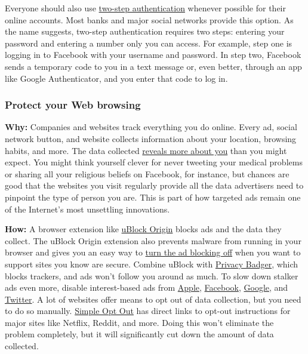 Everyone should also use
\href{https://www.nytimes3xbfgragh.onion/2019/03/27/technology/personaltech/two-step-authentication.html}{two-step
authentication} whenever possible for their online accounts. Most banks
and major social networks provide this option. As the name suggests,
two-step authentication requires two steps: entering your password and
entering a number only you can access. For example, step one is logging
in to Facebook with your username and password. In step two, Facebook
sends a temporary code to you in a text message or, even better, through
an app like Google Authenticator, and you enter that code to log in.~

\hypertarget{protect-your-web-browsing}{%
\subsubsection{Protect your Web
browsing}\label{protect-your-web-browsing}}

\textbf{Why:} Companies and websites track everything you do online.
Every ad, social network button, and website collects information about
your location, browsing habits, and more. The data collected
\href{https://www.nytimes3xbfgragh.onion/2018/08/15/technology/personaltech/stop-targeted-stalker-ads.html}{reveals
more about you} than you might expect. You might think yourself clever
for never tweeting your medical problems or sharing all your religious
beliefs on Facebook, for instance, but chances are good that the
websites you visit regularly provide all the data advertisers need to
pinpoint the type of person you are. This is part of how targeted ads
remain one of the Internet's most unsettling innovations.

\textbf{How:} A browser extension like
\href{https://github.com/gorhill/uBlock}{uBlock Origin} blocks ads and
the data they collect. The uBlock Origin extension also prevents malware
from running in your browser and gives you an easy way to
\href{https://github.com/gorhill/uBlock/wiki/How-to-whitelist-a-web-site}{turn
the ad blocking off} when you want to support sites you know are secure.
Combine uBlock with \href{https://www.eff.org/privacybadger}{Privacy
Badger}, which blocks trackers, and ads won't follow you around as much.
To slow down stalker ads even more, disable interest-based ads from
\href{https://support.apple.com/en-us/HT202074}{Apple},
\href{https://www.facebookcorewwwi.onion/help/568137493302217}{Facebook},
\href{https://support.google.com/ads/answer/2662922?hl=en}{Google}, and
\href{https://business.twitter.com/en/help/ads-policies/other-policy-requirements/interest-based-opt-out-policy.html}{Twitter}.
A lot of websites offer means to opt out of data collection, but you
need to do so manually. \href{http://simpleoptout.com/}{Simple Opt Out}
has direct links to opt-out instructions for major sites like Netflix,
Reddit, and more. Doing this won't eliminate the problem completely, but
it will significantly cut down the amount of data collected.

